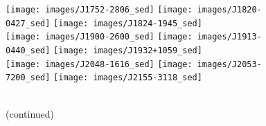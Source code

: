 \documentclass{pasa}%
\begin{document}
\begin{figure*}\ContinuedFloat
\texttt{[image: images/J1752-2806\_sed]}\hspace*{-0.5em}%
\hspace*{-0.5em}\texttt{[image: images/J1820-0427\_sed]}\hspace*{-0.5em}%
\hspace*{-0.5em}\texttt{[image: images/J1824-1945\_sed]} \\[-0.6em]
\texttt{[image: images/J1900-2600\_sed]}\hspace*{-0.5em}%
\hspace*{-0.5em}\texttt{[image: images/J1913-0440\_sed]}\hspace*{-0.5em}%
\hspace*{-0.5em}\texttt{[image: images/J1932+1059\_sed]} \\[-0.6em]
\texttt{[image: images/J2048-1616\_sed]}\hspace*{-0.5em}%
\hspace*{-0.5em}\texttt{[image: images/J2053-7200\_sed]}\hspace*{-0.5em}%
\hspace*{-0.5em}\texttt{[image: images/J2155-3118\_sed]} \\[-0.6em]
\\
\caption{(continued)}
\end{figure*}
\end{document}
